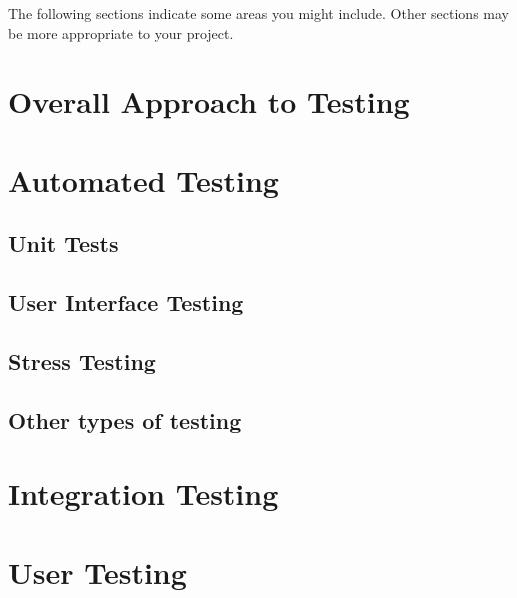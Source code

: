 The following sections indicate some areas you might include. Other sections may be more appropriate to your project.

\section{Overall Approach to Testing}

\section{Automated Testing}

\subsection{Unit Tests}

\subsection{User Interface Testing}

\subsection{Stress Testing}

\subsection{Other types of testing}

\section{Integration Testing}

\section{User Testing}
